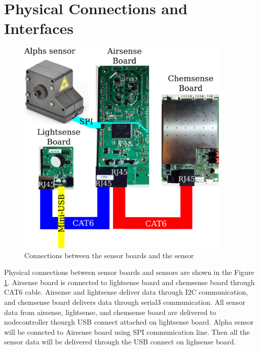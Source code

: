 \section{Physical Connections and Interfaces}

\begin{figure}[h]
\begin{center}
\includegraphics[width=4in]{g4353.png}
\caption{Connections between the sensor boards and the sensor}
\label{fig:physicalConnections}
\end{center}
\end{figure}

Physical connections between sensor boards and sensors are shown in the Figure \ref{fig:physicalConnections}. Airsense board is connected to lightsense board and chemsense board through CAT6 cable. Airsense and lightsense deliver data through I2C communication, and chemsense board delivers data through serial3 communication. All sensor data from airsense, lightsense, and chemsense board are delivered to nodecontroller thourgh USB connect attached on lightsense board. Alpha sensor will be conncted to Airsense board using SPI communication line. Then all the sensor data will be delivered through the USB connect on lighsense board.